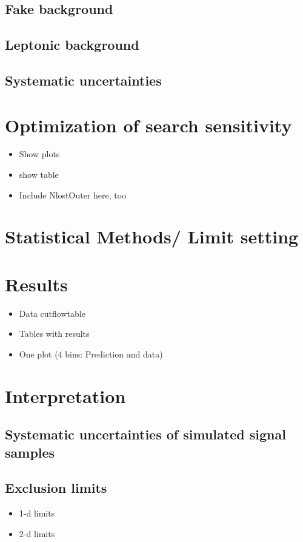 \subsection{Fake background}
\subsection{Leptonic background}
\subsection{Systematic uncertainties}

\section{Optimization of search sensitivity}
\label{sec:Optimization}
\begin{itemize}
\item Show plots
\item show table
\item Include NlostOuter here, too
\end{itemize}

\section{Statistical Methods/ Limit setting}
\label{sec:LimitSetting}

\section{Results}
\label{sec:Results}
\begin{itemize}
\item Data cutflowtable
\item Tables with results
\item One plot (4 bins: Prediction and data)
\end{itemize}

\section{Interpretation}
\label{sec:Interpretation}
\subsection{Systematic uncertainties of simulated signal samples}
\subsection{Exclusion limits}
\begin{itemize}
\item 1-d limits
\item 2-d limits
\end{itemize}

